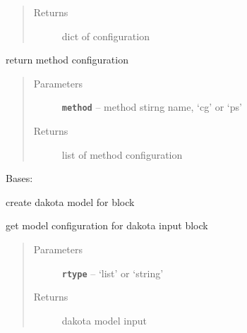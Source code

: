\documentclass[letterpaper,10pt,english]{sphinxmanual}
\begin{document}
\begin{fulllineitems}
\begin{fulllineitems}
\begin{quote}
\begin{description}
\item[{Returns}] \leavevmode
dict of configuration

\end{description}\end{quote}

\end{fulllineitems}


\begin{fulllineitems}
\label{src/apidocs/genopt:genopt.DakotaMethod.method}
return method configuration
\begin{quote}\begin{description}
\item[{Parameters}] \leavevmode
\textbf{\texttt{method}} -- method stirng name, `cg' or `ps'

\item[{Returns}] \leavevmode
list of method configuration

\end{description}\end{quote}

\end{fulllineitems}


\end{fulllineitems}


\begin{fulllineitems}
\label{src/apidocs/genopt:genopt.DakotaModel}
Bases: \href{https://docs.python.org/2/library/functions.html\#object}{}

create dakota model for  block

\begin{fulllineitems}
\label{src/apidocs/genopt:genopt.DakotaModel.get_config}
get model configuration for dakota input block
\begin{quote}\begin{description}
\item[{Parameters}] \leavevmode
\textbf{\texttt{rtype}} -- `list' or `string'

\item[{Returns}] \leavevmode
dakota model input

\end{description}\end{quote}

\end{fulllineitems}


\end{fulllineitems}
\end{document}
